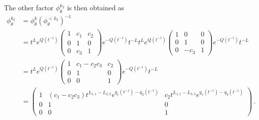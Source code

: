 \begin{comment}
  \[
    \begin{pmatrix}
      1 & 0 & 0
      \\0 & 1 & 0
      \\0 & c & 1
    \end{pmatrix}
    \begin{pmatrix}
      1 & 0 & 0
      \\0 & 1 & 0
      \\0 & -c & 1
    \end{pmatrix}
    =
    \begin{pmatrix}
      1 & 0 & 0
      \\0 & 1 & 0
      \\0 & c-c & 1
    \end{pmatrix}
    =
    \begin{pmatrix}
      1 & 0 & 0
      \\0 & 1 & 0
      \\0 & 0 & 1
    \end{pmatrix}
  \]
\end{comment}
The other factor $\phi_\theta^{k_2}$ is then obtained as
\begin{align*}
  \phi_\theta^{k_2}&= \phi_\theta^{k} \left(\phi_\theta^{<k_2}\right)^{-1}
\\&=t^{L}e^{Q(t^{-1})}
  \begin{pmatrix}
    1     & c_1 & c_2
  \\0     & 1     & 0
  \\0     & c_3 & 1
  \end{pmatrix}
  e^{-Q(t^{-1})}t^{-L}
  t^{L}e^{Q(t^{-1})}
  \begin{pmatrix}
    1     & 0    & 0
  \\0     & 1    & 0
  \\0     & -c_3 & 1
  \end{pmatrix}
  e^{-Q(t^{-1})}t^{-L}
\\&=t^{L}e^{Q(t^{-1})}
  \begin{pmatrix}
    1     & c_1-c_2c_3 & c_2
  \\0     & 1          & 0
  \\0     & 0          & 1
  \end{pmatrix}
  e^{-Q(t^{-1})}t^{-L}
\\&=\begin{pmatrix}
    1 & (c_1-c_2c_3) t^{L_{1,1}-L_{2,2}}e^{q_1(t^{-1})-q_2(t^{-1})}
    & c_2 t^{L_{1,1}-L_{3,3}}e^{q_1(t^{-1})-q_3(t^{-1})}
    \\0     & 1     & 0
    \\0 & 0 & 1
  \end{pmatrix}
  \,.
\end{align*}

